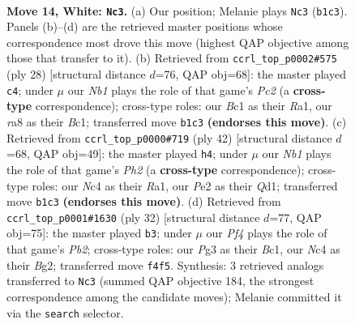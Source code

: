 \documentclass[11pt]{article}
\begin{document}
\clearpage

\begin{figure}[p]\centering
\begin{subfigure}{0.46\textwidth}\centering
\resizebox{\linewidth}{!}{%
\newchessgame
\chessboard[
  setfen={r2rb1k1/ppq1bpp1/n1p1pn2/7p/P1NP1P2/1P4P1/4P1BP/RNBQR1K1 w - - 0 14},
  showmover=false,
  pgfstyle=straightmove, color=movearrow, markmove={b1-c3}
]}
\caption{}
\end{subfigure}\hfill
\begin{subfigure}{0.46\textwidth}\centering
\resizebox{\linewidth}{!}{%
\newchessgame
\chessboard[
  setfen={r4rk1/1b1qbppp/pp1ppn2/8/P2NP3/1P4P1/2P2PBP/R1BQR1K1 w - - 2 15},
  showmover=false,
  pgfstyle=straightmove, color=movearrow, markmove={c2-c4}
]}
\caption{}
\end{subfigure}
\\[4pt]
\begin{subfigure}{0.46\textwidth}\centering
\resizebox{\linewidth}{!}{%
\newchessgame
\chessboard[
  setfen={r4rk1/1pqb1pb1/3pn1p1/p6p/2PpN3/1P1P1B2/P4PPP/R1BQR1K1 w - - 6 22},
  showmover=false,
  pgfstyle=straightmove, color=movearrow, markmove={h2-h4}
]}
\caption{}
\end{subfigure}\hfill
\begin{subfigure}{0.46\textwidth}\centering
\resizebox{\linewidth}{!}{%
\newchessgame
\chessboard[
  setfen={r1r3k1/1bq1bppp/pp1ppn2/8/P1PNP3/6P1/1P2QPBP/R1BR2K1 w - - 1 17},
  showmover=false,
  pgfstyle=straightmove, color=movearrow, markmove={b2-b3}
]}
\caption{}
\end{subfigure}
\caption{\textbf{Move 14, White: \texttt{Nc3}.} (a) Our position; Melanie plays \texttt{Nc3} (\texttt{b1c3}). Panels (b)--(d) are the retrieved master positions whose correspondence most drove this move (highest QAP objective among those that transfer to it). (b) Retrieved from \texttt{ccrl\_top\_p0002\#575} (ply 28) [structural distance $d$=76, QAP obj=68]: the master played \texttt{c4}; under $\mu$ our \emph{Nb1} plays the role of that game's \emph{Pc2} (a \textbf{cross-type} correspondence); cross-type roles: our \emph{B}c1 as their \emph{R}a1, our \emph{r}a8 as their \emph{B}c1; transferred move \texttt{b1c3} \textbf{(endorses this move)}. (c) Retrieved from \texttt{ccrl\_top\_p0000\#719} (ply 42) [structural distance $d$=68, QAP obj=49]: the master played \texttt{h4}; under $\mu$ our \emph{Nb1} plays the role of that game's \emph{Ph2} (a \textbf{cross-type} correspondence); cross-type roles: our \emph{N}c4 as their \emph{R}a1, our \emph{P}e2 as their \emph{Q}d1; transferred move \texttt{b1c3} \textbf{(endorses this move)}. (d) Retrieved from \texttt{ccrl\_top\_p0001\#1630} (ply 32) [structural distance $d$=77, QAP obj=75]: the master played \texttt{b3}; under $\mu$ our \emph{Pf4} plays the role of that game's \emph{Pb2}; cross-type roles: our \emph{P}g3 as their \emph{B}c1, our \emph{N}c4 as their \emph{B}g2; transferred move \texttt{f4f5}. Synthesis: 3 retrieved analogs transferred to \texttt{Nc3} (summed QAP objective 184, the strongest correspondence among the candidate moves); Melanie committed it via the \texttt{search} selector.}
\label{fig:thought-m26}
\end{figure}
\end{document}

